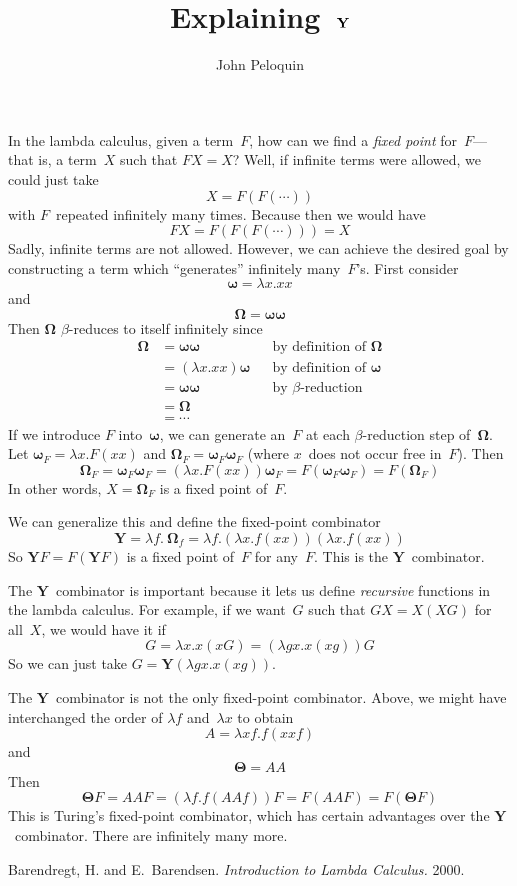 \documentclass[letterpaper,12pt]{article}
\title{Explaining~\(\Y\)}
\author{John Peloquin}
\date{}
\newcommand{\Y}{\mathbf{Y}}
\newcommand{\om}{\mathbf{\omega}}
\newcommand{\Om}{\mathbf{\Omega}}
\newcommand{\Th}{\mathbf{\Theta}}
\begin{document}
\maketitle

\noindent In the lambda calculus, given a term~\(F\), how can we find a \emph{fixed point} for~\(F\)---that is, a term~\(X\) such that \(FX=X\)? Well, if infinite terms were allowed, we could just take
\[X=F(F(\cdots))\]
with \(F\)~repeated infinitely many times. Because then we would have
\[FX=F(F(F(\cdots)))=X\]
Sadly, infinite terms are not allowed. However, we can achieve the desired goal by constructing a term which ``generates'' infinitely many~\(F\)'s. First consider
\[\om=\lambda x.xx\]
and
\[\Om=\om\om\]
Then \(\Om\) \(\beta\)-reduces to itself infinitely since
\begin{align*}
\Om&=\om\om&&\text{by definition of }\Om\\
	&=(\lambda x.xx)\om&&\text{by definition of }\om\\
	&=\om\om&&\text{by }\beta\text{-reduction}\\
	&=\Om&&\\
	&=\cdots&&
\end{align*}
If we introduce \(F\) into~\(\om\), we can generate an~\(F\) at each \(\beta\)-reduction step of~\(\Om\). Let \(\om_F=\lambda x.F(xx)\) and \(\Om_F=\om_F\om_F\) (where \(x\)~does not occur free in~\(F\)). Then
\[\Om_F=\om_F\om_F=(\lambda x.F(xx))\om_F=F(\om_F\om_F)=F(\Om_F)\]
In other words, \(X=\Om_F\) is a fixed point of~\(F\).

We can generalize this and define the fixed-point combinator
\[\Y=\lambda f.\ \Om_f=\lambda f.(\lambda x.f(xx))(\lambda x.f(xx))\]
So \(\Y F=F(\Y F)\) is a fixed point of~\(F\) for any~\(F\). This is the \(\Y\)~combinator.

The \(\Y\)~combinator is important because it lets us define \emph{recursive} functions in the lambda calculus. For example, if we want~\(G\) such that \(GX=X(XG)\) for all~\(X\), we would have it if
\[G=\lambda x.x(xG)=(\lambda gx.x(xg))G\]
So we can just take \(G=\Y(\lambda gx.x(xg))\).

The \(\Y\)~combinator is not the only fixed-point combinator. Above, we might have interchanged the order of \(\lambda f\) and~\(\lambda x\) to obtain
\[A=\lambda xf.f(xxf)\]
and
\[\Th=AA\]
Then
\[\Th F=AAF=(\lambda f.f(AAf))F=F(AAF)=F(\Th F)\]
This is Turing's fixed-point combinator, which has certain advantages over the \(\Y\)~combinator. There are infinitely many more.
\begin{thebibliography}{0}
 Barendregt, H. and E.~Barendsen. \textit{Introduction to Lambda Calculus.} 2000.
\end{thebibliography}
\end{document}
